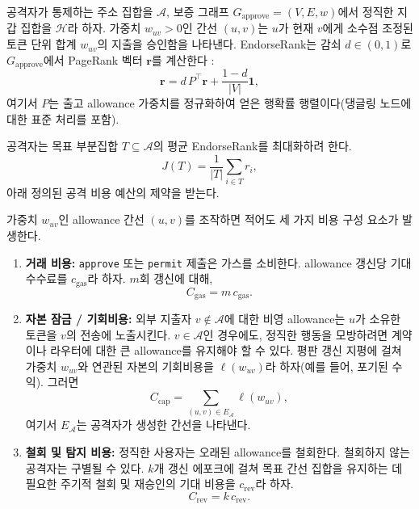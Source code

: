 
공격자가 통제하는 주소 집합을 $\mathcal{A}$, 보증 그래프 $G_{\text{approve}}=(V,E,w)$에서 정직한 지갑 집합을 $\mathcal{H}$라 하자. 가중치 $w_{uv}>0$인 간선 $(u,v)$는 $u$가 현재 $v$에게 소수점 조정된 토큰 단위 합계 $w_{uv}$의 지출을 승인함을 나타낸다. EndorseRank는 감쇠 $d\in(0,1)$로 $G_{\text{approve}}$에서 PageRank 벡터 $\mathbf{r}$를 계산한다 :
\begin{equation}
\label{eq:pagerank-sybil}
\mathbf{r} = d\, P^{\top} \mathbf{r} + \frac{1-d}{|V|}\mathbf{1},
\end{equation}
여기서 $P$는 출고 allowance 가중치를 정규화하여 얻은 행확률 행렬이다(댕글링 노드에 대한 표준 처리를 포함).

공격자는 목표 부분집합 $T\subseteq\mathcal{A}$의 평균 EndorseRank를 최대화하려 한다.
\begin{equation}
\label{eq:objective}
J(T) = \frac{1}{|T|}\sum_{i\in T} r_i,
\end{equation}
아래 정의된 공격 비용 예산의 제약을 받는다.


가중치 $w_{uv}$인 allowance 간선 $(u,v)$를 조작하면 적어도 세 가지 비용 구성 요소가 발생한다.

\begin{enumerate}
\item \textbf{거래 비용:} \texttt{approve} 또는 \texttt{permit} 제출은 가스를 소비한다. allowance 갱신당 기대 수수료를 $c_{\mathrm{gas}}$라 하자. $m$회 갱신에 대해,
\begin{equation}
C_{\mathrm{gas}} = m\, c_{\mathrm{gas}}.
\end{equation}

\item \textbf{자본 잠금 / 기회비용:} 외부 지출자 $v\notin\mathcal{A}$에 대한 비영 allowance는 $u$가 소유한 토큰을 $v$의 전송에 노출시킨다. $v\in\mathcal{A}$인 경우에도, 정직한 행동을 모방하려면 계약이나 라우터에 대한 큰 allowance를 유지해야 할 수 있다. 평판 갱신 지평에 걸쳐 가중치 $w_{uv}$와 연관된 자본의 기회비용을 $\ell(w_{uv})$라 하자(예를 들어, 포기된 수익). 그러면
\begin{equation}
C_{\mathrm{cap}} = \sum_{(u,v)\in E_{\mathcal{A}}} \ell(w_{uv}),
\end{equation}
여기서 $E_{\mathcal{A}}$는 공격자가 생성한 간선을 나타낸다.

\item \textbf{철회 및 탐지 비용:} 정직한 사용자는 오래된 allowance를 철회한다. 철회하지 않는 공격자는 구별될 수 있다. $k$개 갱신 에포크에 걸쳐 목표 간선 집합을 유지하는 데 필요한 주기적 철회 및 재승인의 기대 비용을 $c_{\mathrm{rev}}$라 하자.
\begin{equation}
C_{\mathrm{rev}} = k\, c_{\mathrm{rev}}.
\end{equation}
\end{enumerate}

